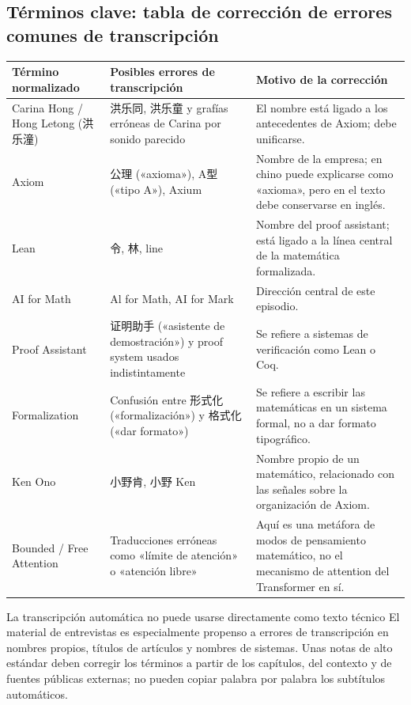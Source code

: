 \documentclass[a4paper]{article}
\begin{document}
\subsection{Términos clave: tabla de corrección de errores comunes de transcripción}

\noindent\begin{longtable}{p{}p{}p{}}
\toprule
Término normalizado & Posibles errores de transcripción & Motivo de la corrección \\
\midrule
Carina Hong / Hong Letong (洪乐潼) & 洪乐同, 洪乐童 y grafías erróneas de Carina por sonido parecido & El nombre está ligado a los antecedentes de Axiom; debe unificarse. \\
Axiom & 公理 («axioma»), A型 («tipo A»), Axium & Nombre de la empresa; en chino puede explicarse como «axioma», pero en el texto debe conservarse en inglés. \\
Lean & 令, 林, line & Nombre del proof assistant; está ligado a la línea central de la matemática formalizada. \\
AI for Math & Al for Math, AI for Mark & Dirección central de este episodio. \\
Proof Assistant & 证明助手 («asistente de demostración») y proof system usados indistintamente & Se refiere a sistemas de verificación como Lean o Coq. \\
Formalization & Confusión entre 形式化 («formalización») y 格式化 («dar formato») & Se refiere a escribir las matemáticas en un sistema formal, no a dar formato tipográfico. \\
Ken Ono & 小野肯, 小野 Ken & Nombre propio de un matemático, relacionado con las señales sobre la organización de Axiom. \\
Bounded / Free Attention & Traducciones erróneas como «límite de atención» o «atención libre» & Aquí es una metáfora de modos de pensamiento matemático, no el mecanismo de attention del Transformer en sí. \\
\bottomrule
\end{longtable}

\begin{warningbox}{La transcripción automática no puede usarse directamente como texto técnico}
El material de entrevistas es especialmente propenso a errores de transcripción en nombres propios, títulos de artículos y nombres de sistemas. Unas notas de alto estándar deben corregir los términos a partir de los capítulos, del contexto y de fuentes públicas externas; no pueden copiar palabra por palabra los subtítulos automáticos.
\end{warningbox}
\end{document}
